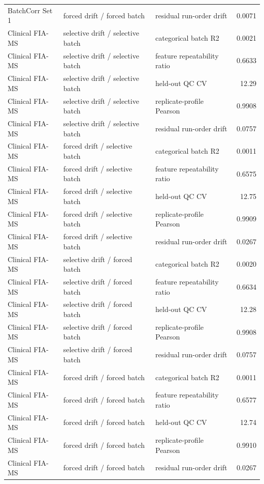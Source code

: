 \begin{longtable}{lllr}
BatchCorr Set 1 & forced drift / forced batch & residual run-order drift & 0.0071 \\
Clinical FIA-MS & selective drift / selective batch & categorical batch R2 & 0.0021 \\
Clinical FIA-MS & selective drift / selective batch & feature repeatability ratio & 0.6633 \\
Clinical FIA-MS & selective drift / selective batch & held-out QC CV & 12.29 \\
Clinical FIA-MS & selective drift / selective batch & replicate-profile Pearson & 0.9908 \\
Clinical FIA-MS & selective drift / selective batch & residual run-order drift & 0.0757 \\
Clinical FIA-MS & forced drift / selective batch & categorical batch R2 & 0.0011 \\
Clinical FIA-MS & forced drift / selective batch & feature repeatability ratio & 0.6575 \\
Clinical FIA-MS & forced drift / selective batch & held-out QC CV & 12.75 \\
Clinical FIA-MS & forced drift / selective batch & replicate-profile Pearson & 0.9909 \\
Clinical FIA-MS & forced drift / selective batch & residual run-order drift & 0.0267 \\
Clinical FIA-MS & selective drift / forced batch & categorical batch R2 & 0.0020 \\
Clinical FIA-MS & selective drift / forced batch & feature repeatability ratio & 0.6634 \\
Clinical FIA-MS & selective drift / forced batch & held-out QC CV & 12.28 \\
Clinical FIA-MS & selective drift / forced batch & replicate-profile Pearson & 0.9908 \\
Clinical FIA-MS & selective drift / forced batch & residual run-order drift & 0.0757 \\
Clinical FIA-MS & forced drift / forced batch & categorical batch R2 & 0.0011 \\
Clinical FIA-MS & forced drift / forced batch & feature repeatability ratio & 0.6577 \\
Clinical FIA-MS & forced drift / forced batch & held-out QC CV & 12.74 \\
Clinical FIA-MS & forced drift / forced batch & replicate-profile Pearson & 0.9910 \\
Clinical FIA-MS & forced drift / forced batch & residual run-order drift & 0.0267 \\

\end{longtable}
